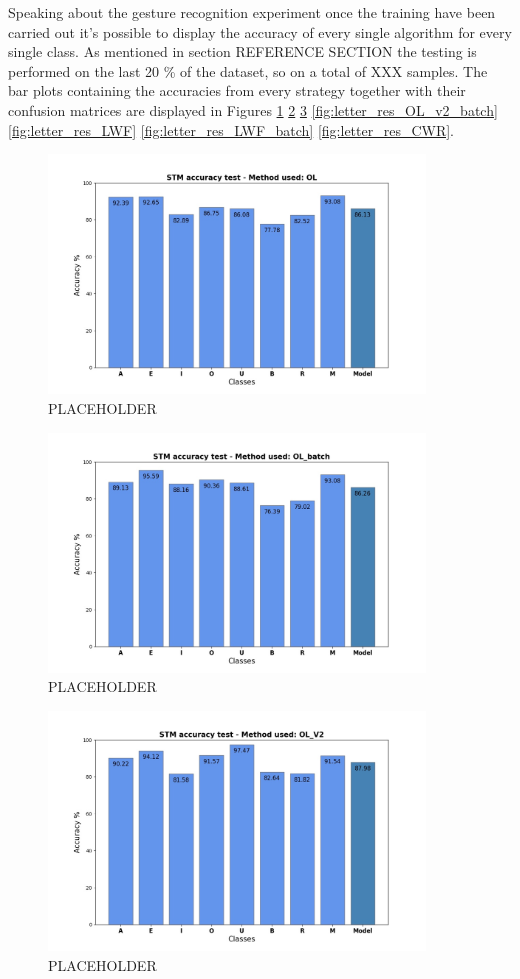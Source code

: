 \documentclass[12pt]{report}
\begin{document}
Speaking about the gesture recognition experiment once the training have been carried out it's possible to display the accuracy of every single algorithm for every single class. As mentioned in section REFERENCE SECTION the testing is performed on the last 20 \% of the dataset, so on a total of XXX samples. The bar plots containing the accuracies from every strategy together with their confusion matrices are displayed in Figures \ref{fig:letter_res_OL} \ref{fig:letter_res_OL_batch} \ref{fig:letter_res_OL_v2} \ref{fig:letter_res_OL_v2_batch} \ref{fig:letter_res_LWF} \ref{fig:letter_res_LWF_batch} \ref{fig:letter_res_CWR}.  
%
\begin{figure}[h!]
    \centering
    \includegraphics[width=100mm]{Figures/Chapter5/STM_barPlot_OL.jpg} 
    \caption{PLACEHOLDER}
    \label{fig:letter_res_OL}    
\end{figure}
%
%
\begin{figure}[h!]
    \centering
    \includegraphics[width=100mm]{Figures/Chapter5/STM_barPlot_OL_batch.jpg} 
    \caption{PLACEHOLDER}
    \label{fig:letter_res_OL_batch}    
\end{figure}
%
%
\begin{figure}[h!]
    \centering
    \includegraphics[width=100mm]{Figures/Chapter5/STM_barPlot_OL_V2.jpg} 
    \caption{PLACEHOLDER}
    \label{fig:letter_res_OL_v2}    
\end{figure}
\end{document}
